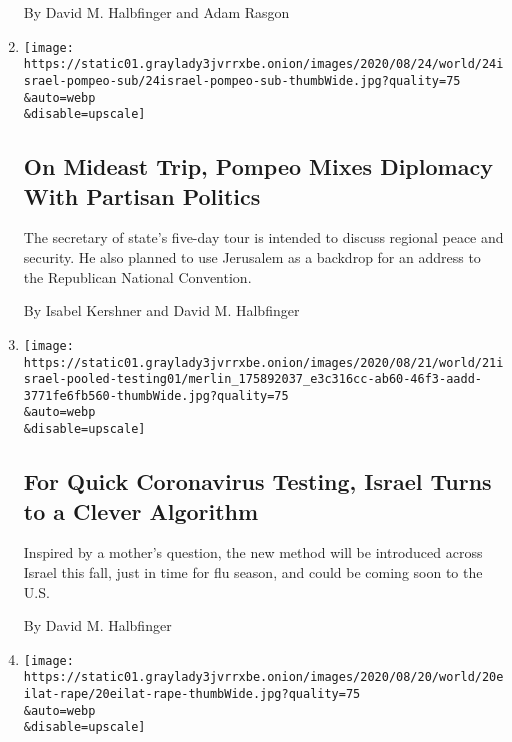 \begin{enumerate}
  By David M. Halbfinger and Adam Rasgon
\item
  \href{/2020/08/24/world/middleeast/pompeo-jerusalem-rnc.html}{}

  \texttt{[image: https://static01.graylady3jvrrxbe.onion/images/2020/08/24/world/24israel-pompeo-sub/24israel-pompeo-sub-thumbWide.jpg?quality=75\\\&auto=webp\\\&disable=upscale]}

  \hypertarget{on-mideast-trip-pompeo-mixes-diplomacy-with-partisan-politics}{%
  \subsection{On Mideast Trip, Pompeo Mixes Diplomacy With Partisan
  Politics}\label{on-mideast-trip-pompeo-mixes-diplomacy-with-partisan-politics}}

  The secretary of state's five-day tour is intended to discuss regional
  peace and security. He also planned to use Jerusalem as a backdrop for
  an address to the Republican National Convention.

  By Isabel Kershner and David M. Halbfinger
\item
  \href{/2020/08/21/health/fast-coronavirus-testing-israel.html}{}

  \texttt{[image: https://static01.graylady3jvrrxbe.onion/images/2020/08/21/world/21israel-pooled-testing01/merlin\_175892037\_e3c316cc-ab60-46f3-aadd-3771fe6fb560-thumbWide.jpg?quality=75\\\&auto=webp\\\&disable=upscale]}

  \hypertarget{for-quick-coronavirus-testing-israel-turns-to-a-clever-algorithm}{%
  \subsection{For Quick Coronavirus Testing, Israel Turns to a Clever
  Algorithm}\label{for-quick-coronavirus-testing-israel-turns-to-a-clever-algorithm}}

  Inspired by a mother's question, the new method will be introduced
  across Israel this fall, just in time for flu season, and could be
  coming soon to the U.S.

  By David M. Halbfinger
\item
  \href{/2020/08/20/world/middleeast/israel-girl-gang-raped-eilat.html}{}

  \texttt{[image: https://static01.graylady3jvrrxbe.onion/images/2020/08/20/world/20eilat-rape/20eilat-rape-thumbWide.jpg?quality=75\\\&auto=webp\\\&disable=upscale]}

  \hypertarget{vacationing-israeli-teen-says-she-was-gang-raped-shocking-the-nation}{%
}
\end{enumerate}
